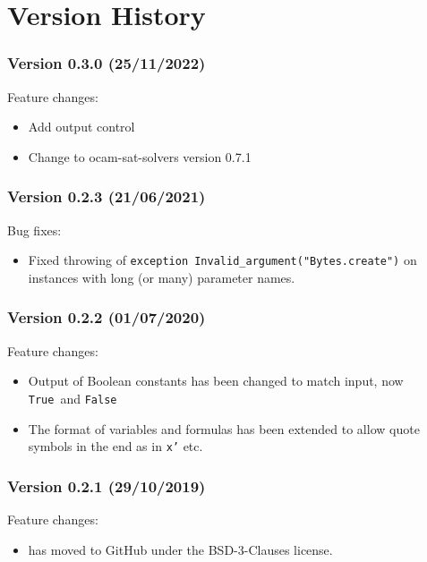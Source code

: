 \documentclass[twoside]{article}
\begin{document}
\section{Version History}

\subsubsection*{Version 0.3.0 (25/11/2022)}
Feature changes:
\begin{itemize}
\item Add output control
\item Change to ocam-sat-solvers version 0.7.1
\end{itemize}

\subsubsection*{Version 0.2.3 (21/06/2021)}

Bug fixes:
\begin{itemize}
\item Fixed throwing of \texttt{exception Invalid_argument("Bytes.create")} on instances with long (or many) parameter names.
\end{itemize}

\subsubsection*{Version 0.2.2 (01/07/2020)}

Feature changes:
\begin{itemize}
\item Output of Boolean constants has been changed to match input, now \texttt{True} and \texttt{False}
\item The format of variables and formulas has been extended to allow quote symbols in the end as in \texttt{x'} etc.
\end{itemize}

\subsubsection*{Version 0.2.1 (29/10/2019)}

Feature changes:
\begin{itemize}
\item \DiMo has moved to GitHub under the BSD-3-Clauses license.
\end{itemize}
\end{document}
